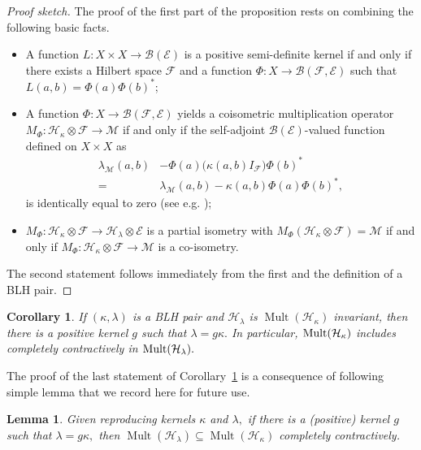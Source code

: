 \documentclass[a4paper,reqno,index]{amsart}
\numberwithin{equation}{section}
\newtheorem{lemma}[theorem]{Lemma}
\newcommand{\Mult}{\operatorname{Mult}}
\newcommand{\cM}{\mathcal{M}}
\newcommand{\cH}{\mathcal{H}}
\newcommand{\genk}{\kappa} %
\newcommand{\genl}{\lambda} %
\newtheorem{corollary}[theorem]{Corollary}
\theoremstyle{definition}
\begin{document}
\begin{proof}[Proof sketch]
The proof   of the first part of the proposition rests on combining the following basic facts. 
\begin{itemize}
    \item[(i)] A function $L: X\times X \to \mathcal{B}(\mathcal{E})$ is a positive semi-definite kernel if and only if there exists a Hilbert space $\mathcal{F}$ and a function $\Phi: X\to\mathcal{B}(\mathcal{F}, \mathcal{E})$ such that $L(a, b)=\Phi(a)\Phi(b)^*$;
    \item[(ii)] A function $\Phi:X\to\mathcal{B}(\mathcal{F}, \mathcal{E})$ yields a coisometric multiplication operator $M_{\Phi}: \mathcal{H}_{\genk}\otimes\mathcal{F}\to \mathcal{M}$ if and only if the self-adjoint $\mathcal{B}(\mathcal{E})$-valued function defined on $X\times X$ as
    \begin{align*}
 \genl_\cM(a, b)&-\Phi(a)\big(\genk(a, b) I_{\mathcal{F}}\big)\Phi(b)^*\\
        =\ & \genl_\cM(a, b)-\kappa(a, b)\Phi(a)\Phi(b)^*, 
    \end{align*}
is identically equal to zero (see e.g. \cite[Lemma 2.1(b)]{Beurlingfactor}); 
\item[(iii)] $M_{\Phi}: \mathcal{H}_{\genk}\otimes\mathcal{F}\to \mathcal{H}_{\genl}\otimes\mathcal{E}$ is a partial isometry with $M_{\Phi}(\mathcal{H}_{\genk}\otimes\mathcal{F})=\mathcal{M}$ if and only if $M_{\Phi}: \mathcal{H}_{\genk}\otimes\mathcal{F}\to \mathcal{M}$ is a co-isometry.   
\end{itemize}

  The second statement follows immediately from the first and the definition of a BLH pair.   
\end{proof}

\begin{corollary} \label{ldividesk}
If $(\genk, \genl)$ is a BLH pair and $\cH_\genl$
is $\Mult(\cH_\genk)$ invariant, then there is a positive kernel $g$ such that $\genl=g\genk.$
In particular, $\textup{Mult}(\mathcal{H}_{\genk})$ includes completely contractively in $\textup{Mult}(\mathcal{H}_{\genl}).$ 
\end{corollary}

The proof of the last statement of Corollary~\ref{ldividesk} is a consequence of following simple lemma that we record here for future use.

\begin{lemma}
  \label{l:cert-cont-include}
    Given  reproducing kernels $\genk$ and $\genl,$ if there is a (positive) kernel $g$ such that
    $\genl= g \genk,$ then $\Mult(\cH_\genl)\subseteq \Mult(\cH_\genk)$ completely contractively.
\end{lemma}
\end{document}
